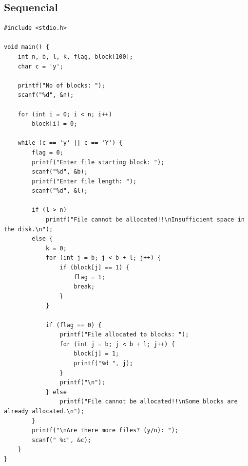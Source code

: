 \subsection{Sequencial}
\begin{lstlisting}[label={list:c_program:queue}]
#include <stdio.h>

void main() {
    int n, b, l, k, flag, block[100];
    char c = 'y';

    printf("No of blocks: ");
    scanf("%d", &n);

    for (int i = 0; i < n; i++)
        block[i] = 0;

    while (c == 'y' || c == 'Y') {
        flag = 0;
        printf("Enter file starting block: ");
        scanf("%d", &b);
        printf("Enter file length: ");
        scanf("%d", &l);

        if (l > n)
            printf("File cannot be allocated!!\nInsufficient space in the disk.\n");
        else {
            k = 0;
            for (int j = b; j < b + l; j++) {
                if (block[j] == 1) {
                    flag = 1;
                    break;
                }
            }

            if (flag == 0) {
                printf("File allocated to blocks: ");
                for (int j = b; j < b + l; j++) {
                    block[j] = 1;
                    printf("%d ", j);
                }
                printf("\n");
            } else
                printf("File cannot be allocated!!\nSome blocks are already allocated.\n");
        }
        printf("\nAre there more files? (y/n): ");
        scanf(" %c", &c);
    }
}
\end{lstlisting}
